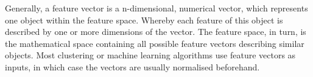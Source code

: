 Generally, a feature vector is a n-dimensional, numerical vector, which represents one object within the feature space. Whereby each feature of this object is described by one or more dimensions of the vector.
The feature space, in turn, is the mathematical space containing all possible feature vectors describing similar objects.
Most clustering or machine learning algorithms use feature vectors as inputs, in which case the vectors are usually normalised beforehand.


